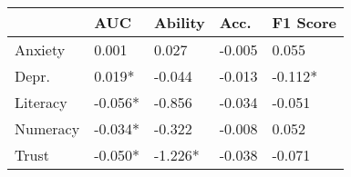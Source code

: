 \begin{tabular}{lllll}
\toprule
 & AUC & Ability & Acc. & F1 Score \\
\midrule
Anxiety & 0.001 & 0.027 & -0.005 & 0.055 \\
Depr. & 0.019* & -0.044 & -0.013 & -0.112* \\
Literacy & -0.056* & -0.856 & -0.034 & -0.051 \\
Numeracy & -0.034* & -0.322 & -0.008 & 0.052 \\
Trust & -0.050* & -1.226* & -0.038 & -0.071 \\
\bottomrule
\end{tabular}
